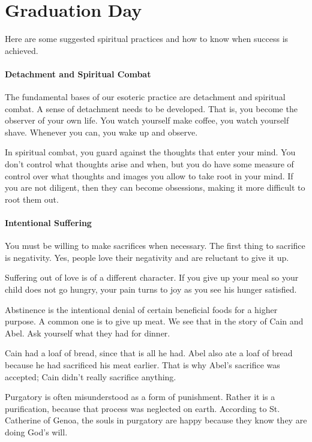 \section{Graduation Day}

Here are some suggested spiritual practices and how to know when success is achieved.

\paragraph{Detachment and Spiritual Combat}
The fundamental bases of our esoteric practice are detachment and spiritual combat. A sense of detachment needs to be developed. That is, you become the observer of your own life. You watch yourself make coffee, you watch yourself shave. Whenever you can, you wake up and observe.

In spiritual combat, you guard against the thoughts that enter your mind. You don't control what thoughts arise and when, but you do have some measure of control over what thoughts and images you allow to take root in your mind. If you are not diligent, then they can become obsessions, making it more difficult to root them out.

\paragraph{Intentional Suffering}
You must be willing to make sacrifices when necessary. The first thing to sacrifice is negativity. Yes, people love their negativity and are reluctant to give it up.

Suffering out of love is of a different character. If you give up your meal so your child does not go hungry, your pain turns to joy as you see his hunger satisfied.

Abstinence is the intentional denial of certain beneficial foods for a higher purpose. A common one is to give up meat. We see that in the story of Cain and Abel. Ask yourself what they had for dinner.

Cain had a loaf of bread, since that is all he had. Abel also ate a loaf of bread because he had sacrificed his meat earlier. That is why Abel's sacrifice was accepted; Cain didn't really sacrifice anything.

Purgatory is often misunderstood as a form of punishment. Rather it is a purification, because that process was neglected on earth. According to St. Catherine of Genoa, the souls in purgatory are happy because they know they are doing God's will.

